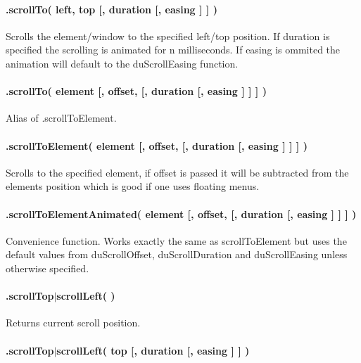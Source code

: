 \paragraph*{{\ttfamily .scroll\+To( left, top \mbox{[}, duration \mbox{[}, easing \mbox{]} \mbox{]} )}}

Scrolls the element/window to the specified left/top position. If {\ttfamily duration} is specified the scrolling is animated for n milliseconds. If {\ttfamily easing} is ommited the animation will default to the {\ttfamily du\+Scroll\+Easing} function.

\paragraph*{{\ttfamily .scroll\+To( element \mbox{[}, offset, \mbox{[}, duration \mbox{[}, easing \mbox{]} \mbox{]} \mbox{]} )}}

Alias of {\ttfamily .scroll\+To\+Element}.

\paragraph*{{\ttfamily .scroll\+To\+Element( element \mbox{[}, offset, \mbox{[}, duration \mbox{[}, easing \mbox{]} \mbox{]} \mbox{]} )}}

Scrolls to the specified element, if {\ttfamily offset} is passed it will be subtracted from the elements position which is good if one uses floating menus.

\paragraph*{{\ttfamily .scroll\+To\+Element\+Animated( element \mbox{[}, offset, \mbox{[}, duration \mbox{[}, easing \mbox{]} \mbox{]} \mbox{]} )}}

Convenience function. Works exactly the same as {\ttfamily scroll\+To\+Element} but uses the default values from {\ttfamily du\+Scroll\+Offset}, {\ttfamily du\+Scroll\+Duration} and {\ttfamily du\+Scroll\+Easing} unless otherwise specified.

\paragraph*{{\ttfamily .scroll\+Top$\vert$scroll\+Left( )}}

Returns current scroll position.

\paragraph*{{\ttfamily .scroll\+Top$\vert$scroll\+Left( top \mbox{[}, duration \mbox{[}, easing \mbox{]} \mbox{]} )}}

